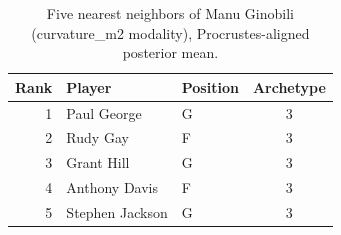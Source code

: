\begin{table}[htbp]
  \centering\small
  \begin{tabular}{rllc}
    \toprule
    Rank & Player & Position & Archetype \\
    \midrule
    1 & Paul George & G & 3 \\
    2 & Rudy Gay & F & 3 \\
    3 & Grant Hill & G & 3 \\
    4 & Anthony Davis & F & 3 \\
    5 & Stephen Jackson & G & 3 \\
    \bottomrule
  \end{tabular}
  \caption{Five nearest neighbors of Manu Ginobili (curvature_m2 modality), Procrustes-aligned posterior mean.}
  \label{tab:Manu_Ginobili_neighbors_curvature_m2}
\end{table}

